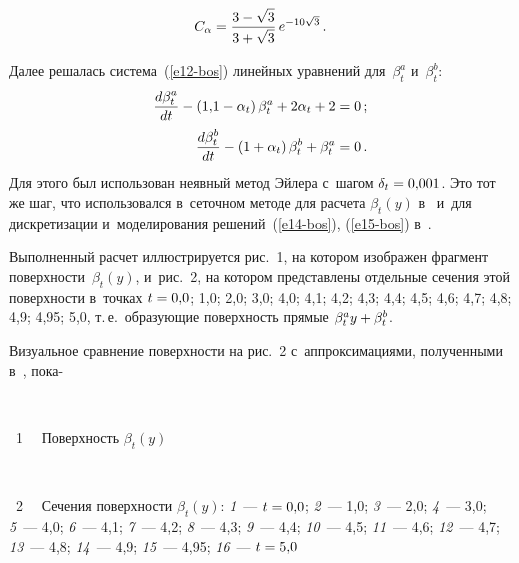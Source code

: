 \begin{multicols}{2}
\noindent
     \begin{equation*}
     C_\alpha= \displaystyle\frac{\displaystyle 3-\sqrt{3}\mathstrut}{\displaystyle 3+\sqrt{3}\mathstrut}\,e^{-10\sqrt{3}}\,.
     \end{equation*}
     
     Далее решалась система~(\ref{e12-bos}) линейных уравнений 
для~$\beta_t^a$ и~$\beta_t^b$:
     \begin{align*}
     \displaystyle\frac{\displaystyle d\beta_t^a\mathstrut}{\displaystyle dt\mathstrut}-\left( 1{,}1-\alpha_t\right)\beta_t^a 
+2\alpha_t+2&=0\,;\\
     \displaystyle\frac{\displaystyle d\beta_t^b\mathstrut}{\displaystyle dt\mathstrut} -\left( 1+\alpha_t\right) \beta_t^b+\beta_t^a&=0\,.
     \end{align*}
Для этого был использован неявный метод Эйлера с~шагом $\delta_t\hm= 
0{,}001$. Это тот же шаг, что использовался в~сеточном методе для расчета 
$\beta_t(y)$ в~\cite{2-bos} и~для дискретизации и~моделирования 
решений~(\ref{e14-bos}), (\ref{e15-bos}) в~\cite{4-bos}.

     Выполненный расчет иллюстрируется рис.~1, на котором изображен 
фрагмент поверхности~$\beta_t(y)$, и~рис.~2, на котором представлены 
отдельные сечения этой поверхности в~точках $t\hm=0{,}0$; 1,0; 2,0; 3,0; 4,0; 
4,1; 4,2; 4,3; 4,4; 4,5; 4,6; 4,7; 4,8; 4,9; 4,95; 5,0, т.\,е.\ образующие поверхность 
прямые $\beta_t^a y \hm+ \beta_t^b$.





     
     Визуальное сравнение поверхности на рис.~2 с~аппроксимациями, 
полученными в~\cite{2-bos, 4-bos}, пока-\linebreak\vspace*{-12pt}

{ \begin{center}  %
 \vspace*{9pt}
    \mbox{%
 \epsfxsize=79.002mm 
 }


\vspace*{6pt}

\noindent
{{\figurename~1}\ \ \small{
Поверхность $\beta_t(y)$
}}
\end{center}
}


{ \begin{center}  %
 \vspace*{9pt}
    \mbox{%
\epsfxsize=73.519mm
}
\end{center}

\noindent
{{\figurename~2}\ \ \small{
Сечения поверхности $\beta_t(y)$:
      \textit{1}~--- $t\hm=0{,}0$; \textit{2}~--- 1,0; \textit{3}~--- 2,0;
      \textit{4}~--- 3,0; \textit{5}~--- 4,0;  \textit{6}~--- 4,1; \textit{7}~--- 4,2; 
      \textit{8}~--- 4,3; \textit{9}~--- 4,4; \textit{10}~--- 4,5;  \textit{11}~--- 4,6; 
      \textit{12}~--- 4,7; \textit{13}~--- 4,8; \textit{14}~--- 4,9; \textit{15}~--- 4,95; 
      \textit{16}~--- $t\hm=5{,}0$
}}
}
     

\end{multicols}

